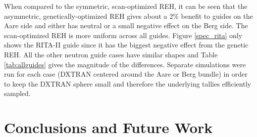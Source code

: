 \documentclass[a4paper]{jpconf}
\begin{document}
When compared to the symmetric, scan-optimized REH, it can be seen that the asymmetric, genetically-optimized REH gives about a 2\% benefit to guides on the Aare side and either has neutral or a small negative effect on the Berg side.  The scan-optimized REH is more uniform across all guides.  Figure \ref{spec_rita} only shows the RITA-II guide since it has the biggest negative effect from the genetic REH.  All the other neutron guide cases have similar shapes and Table \ref{tab:allguides} gives the magnitude of the differences.  Separate simulations were run for each case (DXTRAN centered around the Aare or Berg bundle) in order to keep the DXTRAN sphere small and therefore the underlying tallies efficiently sampled.  

%
%
%

\section{Conclusions and Future Work}
\end{document}

